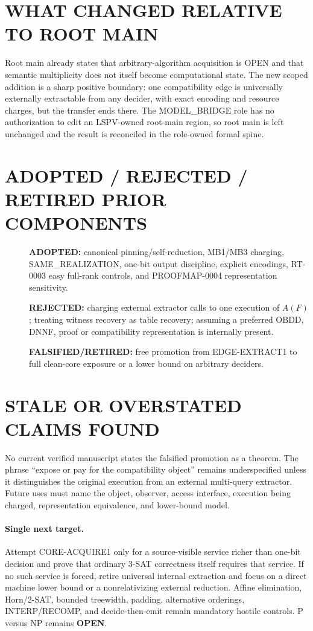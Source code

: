 \documentclass[11pt]{article}
\begin{document}
\section{WHAT CHANGED RELATIVE TO ROOT MAIN}
Root main already states that arbitrary-algorithm acquisition is OPEN and
that semantic multiplicity does not itself become computational state.  The
new scoped addition is a sharp positive boundary: one compatibility edge is
universally externally extractable from any decider, with exact encoding and
resource charges, but the transfer ends there.  The MODEL\_BRIDGE role has no
authorization to edit an LSPV-owned root-main region, so root main is left
unchanged and the result is reconciled in the role-owned formal spine.

\section{ADOPTED / REJECTED / RETIRED PRIOR COMPONENTS}
\begin{description}
\item[] \textbf{ADOPTED:} canonical pinning/self-reduction, MB1/MB3 charging,
SAME\_REALIZATION, one-bit output discipline, explicit encodings, RT-0003
easy full-rank controls, and PROOFMAP-0004 representation sensitivity.
\item[] \textbf{REJECTED:} charging external extractor calls to one execution
of $A(F)$; treating witness recovery as table recovery; assuming a preferred
OBDD, DNNF, proof or compatibility representation is internally present.
\item[] \textbf{FALSIFIED/RETIRED:} free promotion from EDGE-EXTRACT1 to
full clean-core exposure or a lower bound on arbitrary deciders.
\end{description}

\section{STALE OR OVERSTATED CLAIMS FOUND}
No current verified manuscript states the falsified promotion as a theorem.
The phrase ``expose or pay for the compatibility object'' remains
underspecified unless it distinguishes the original execution from an
external multi-query extractor.  Future uses must name the object, observer,
access interface, execution being charged, representation equivalence, and
lower-bound model.

\paragraph{Single next target.}
Attempt CORE-ACQUIRE1 only for a source-visible service richer than one-bit
decision and prove that ordinary 3-SAT correctness itself requires that
service.  If no such service is forced, retire universal internal extraction
and focus on a direct machine lower bound or a nonrelativizing external
reduction.  Affine elimination, Horn/2-SAT, bounded treewidth, padding,
alternative orderings, INTERP/RECOMP, and decide-then-emit remain mandatory
hostile controls.  P versus NP remains \textbf{OPEN}.
\end{document}
